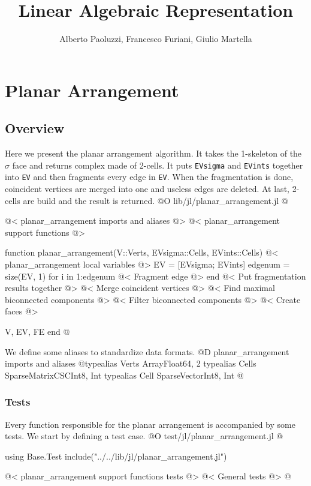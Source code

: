 \documentclass[10pt]{book}
\author{Alberto Paoluzzi, Francesco Furiani, Giulio Martella}
\title{Linear Algebraic Representation}
\begin{document}
\frontmatter
\maketitle
\tableofcontents





\mainmatter

\chapter{Planar Arrangement}

\section{Overview}
Here we present the planar arrangement algorithm. It takes the 1-skeleton of the $\sigma$ face and returns complex made of 2-cells.
It puts \texttt{EVsigma} and \texttt{EVints} together into \texttt{EV} and then fragments every edge in \texttt{EV}. 
When the fragmentation is done, coincident vertices are merged into one and useless edges are deleted. At last,
2-cells are build and the result is returned.
@O lib/jl/planar_arrangement.jl
@{@< planar\_arrangement imports and aliases @>
@< planar\_arrangement support functions @>

function planar_arrangement(V::Verts, EVsigma::Cells, EVints::Cells)
    @< planar\_arrangement local variables @>
    EV = [EVsigma; EVints]
    edgenum = size(EV, 1)
    for i in 1:edgenum
        @< Fragment edge @>
    end
    @< Put fragmentation results together @>
    @< Merge coincident vertices @>
    @< Find maximal biconnected components @>
    @< Filter biconnected components @>
    @< Create faces @>

    V, EV, FE
end 
@}
We define some aliases to standardize data formats.
@D planar\_arrangement imports and aliases
@{typealias Verts Array{Float64, 2}
typealias Cells SparseMatrixCSC{Int8, Int}
typealias Cell SparseVector{Int8, Int}
@}
\subsection{Tests}
Every function responsible for the planar arrangement is accompanied by some tests.
We start by defining a test case.
@O test/jl/planar_arrangement.jl
@{using Base.Test
include("../../lib/jl/planar_arrangement.jl")

@< planar\_arrangement support functions tests @>
@< General tests @>
@}
\end{document}
